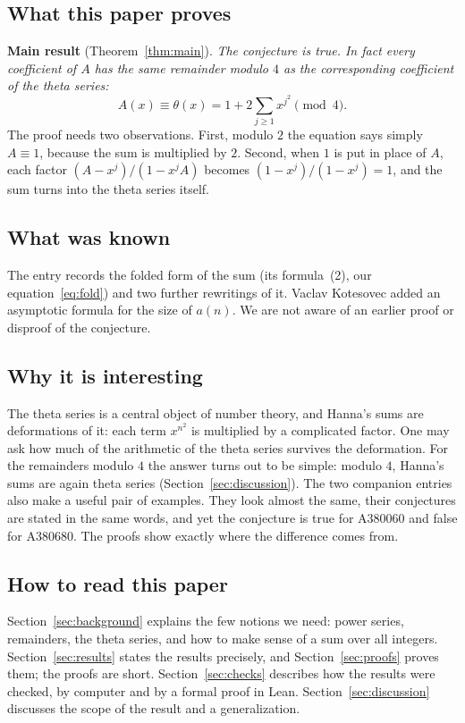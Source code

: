 \documentclass[11pt,a4paper]{article}
\theoremstyle{definition}
\theoremstyle{remark}
\begin{document}
\subsection{What this paper proves}
\textbf{Main result} (Theorem~\ref{thm:main}). \emph{The conjecture is true. In fact every coefficient of $A$
has the same remainder modulo $4$ as the corresponding coefficient of the theta series:}
\[
A(x)\equiv\theta(x)=1+2\sum_{j\ge1}x^{j^2}\pmod 4 .
\]
The proof needs two observations. First, modulo $2$ the equation says simply $A\equiv1$, because the sum is multiplied
by $2$. Second, when $1$ is put in place of $A$, each factor $(A-x^j)/(1-x^jA)$ becomes $(1-x^j)/(1-x^j)=1$, and the sum
turns into the theta series itself.

\subsection{What was known}
The entry records the folded form of the sum (its formula~(2), our equation~\eqref{eq:fold}) and two further
rewritings of it. Vaclav Kotesovec added an asymptotic formula for the size of $a(n)$. We are not aware of an earlier proof or disproof of the conjecture.

\subsection{Why it is interesting}
The theta series is a central object of number theory, and Hanna's sums are deformations of it: each term
$x^{n^2}$ is multiplied by a complicated factor. One may ask how much of the arithmetic of the theta series survives
the deformation. For the remainders modulo $4$ the answer turns out to be simple: modulo $4$, Hanna's sums are again
theta series (Section~\ref{sec:discussion}).
The two companion entries also make a useful pair of examples. They look almost the same, their conjectures are
stated in the same words, and yet the conjecture is true for A380060 and false for A380680. The proofs show exactly where the
difference comes from.

\subsection{How to read this paper}
Section~\ref{sec:background} explains the few notions we need: power series, remainders, the theta series, and how to
make sense of a sum over all integers. Section~\ref{sec:results} states the results precisely, and
Section~\ref{sec:proofs} proves them; the proofs are short. Section~\ref{sec:checks} describes how the results were
checked, by computer and by a formal proof in Lean. Section~\ref{sec:discussion} discusses the scope of the result
and a generalization.
\end{document}

